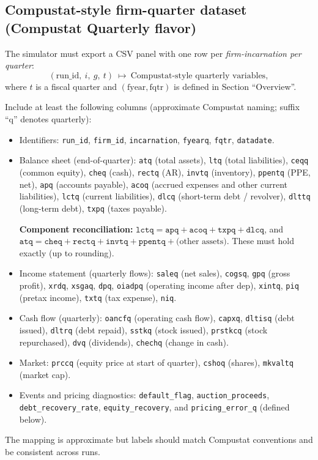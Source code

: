 \documentclass[11pt]{article}
\begin{document}
\subsection{Compustat-style firm-quarter dataset (Compustat Quarterly flavor)}
The simulator must export a CSV panel with one row per \emph{firm-incarnation per quarter}:
\[
(\text{run\_id},\ i,\ g,\ t)\ \mapsto\ \text{Compustat-style quarterly variables},
\]
where $t$ is a fiscal quarter and $(\text{fyear},\text{fqtr})$ is defined in Section ``Overview''.

Include at least the following columns (approximate Compustat naming; suffix ``q'' denotes quarterly):
\begin{itemize}[leftmargin=*]
    \item Identifiers: \texttt{run\_id}, \texttt{firm\_id}, \texttt{incarnation}, \texttt{fyearq}, \texttt{fqtr}, \texttt{datadate}.
    \item Balance sheet (end-of-quarter): 
    \texttt{atq} (total assets), \texttt{ltq} (total liabilities), \texttt{ceqq} (common equity), 
    \texttt{cheq} (cash), \texttt{rectq} (AR), \texttt{invtq} (inventory), \texttt{ppentq} (PPE, net), 
    \texttt{apq} (accounts payable), \texttt{acoq} (accrued expenses and other current liabilities),
    \texttt{lctq} (current liabilities), \texttt{dlcq} (short-term debt / revolver), 
    \texttt{dlttq} (long-term debt), \texttt{txpq} (taxes payable).
    
    \textbf{Component reconciliation:} $\texttt{lctq} = \texttt{apq} + \texttt{acoq} + \texttt{txpq} + \texttt{dlcq}$, and $\texttt{atq} = \texttt{cheq} + \texttt{rectq} + \texttt{invtq} + \texttt{ppentq} + \text{(other assets)}$. These must hold exactly (up to rounding).
    \item Income statement (quarterly flows): 
    \texttt{saleq} (net sales), \texttt{cogsq}, \texttt{gpq} (gross profit),
    \texttt{xrdq}, \texttt{xsgaq}, \texttt{dpq}, \texttt{oiadpq} (operating income after dep),
    \texttt{xintq}, \texttt{piq} (pretax income), \texttt{txtq} (tax expense), \texttt{niq}.
    \item Cash flow (quarterly): 
    \texttt{oancfq} (operating cash flow), \texttt{capxq}, 
    \texttt{dltisq} (debt issued), \texttt{dltrq} (debt repaid),
    \texttt{sstkq} (stock issued), \texttt{prstkcq} (stock repurchased),
    \texttt{dvq} (dividends), \texttt{chechq} (change in cash).
    \item Market: \texttt{prccq} (equity price at start of quarter), \texttt{cshoq} (shares), \texttt{mkvaltq} (market cap).
    \item Events and pricing diagnostics: \texttt{default\_flag}, \texttt{auction\_proceeds}, 
    \texttt{debt\_recovery\_rate}, \texttt{equity\_recovery}, and \texttt{pricing\_error\_q} (defined below).
\end{itemize}
The mapping is approximate but labels should match Compustat conventions and be consistent across runs.
\end{document}
